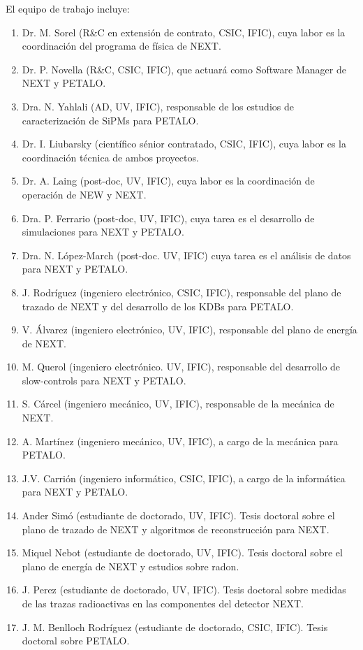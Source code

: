 El equipo de trabajo incluye:
\begin{enumerate}
\item Dr. M. Sorel (R\&C en extensión de contrato, CSIC, IFIC), cuya labor es la coordinación del programa de física de NEXT.
\item Dr. P. Novella (R\&C, CSIC, IFIC), que actuará como Software Manager de NEXT y PETALO.
\item Dra. N. Yahlali (AD, UV, IFIC), responsable de los estudios de caracterización de SiPMs para PETALO. 
\item Dr. I. Liubarsky (científico sénior contratado, CSIC, IFIC), cuya labor es la coordinación técnica de ambos proyectos.
\item Dr. A. Laing (post-doc, UV, IFIC), cuya labor es la coordinación de operación de NEW y NEXT.
\item Dra. P. Ferrario (post-doc, UV, IFIC), cuya tarea es el desarrollo de simulaciones para NEXT y PETALO. 
\item Dra. N. López-March (post-doc. UV, IFIC) cuya tarea es el análisis de datos para NEXT y PETALO.
\item J. Rodríguez (ingeniero electrónico, CSIC, IFIC), responsable del plano de trazado de NEXT y del desarrollo de los KDBs para PETALO. 
\item V. Álvarez (ingeniero electrónico, UV, IFIC), responsable del plano de energía de NEXT.
\item M. Querol (ingeniero electrónico. UV, IFIC), responsable del desarrollo de slow-controls para NEXT y PETALO.
\item S. Cárcel (ingeniero mecánico, UV, IFIC), responsable de la mecánica de NEXT.
\item A. Martínez (ingeniero mecánico, UV, IFIC), a cargo de la mecánica para PETALO. 
\item J.V. Carrión (ingeniero informático, CSIC, IFIC), a cargo de la informática para NEXT y PETALO. 
\item Ander Simó (estudiante de doctorado, UV, IFIC). Tesis doctoral sobre el plano de trazado de NEXT y algoritmos de reconstrucción para NEXT.
\item Miquel Nebot (estudiante de doctorado, UV, IFIC). Tesis doctoral sobre el plano de energía de NEXT y estudios sobre radon.
\item J. Perez (estudiante de doctorado, UV, IFIC). Tesis doctoral sobre medidas de las trazas radioactivas en las componentes del detector NEXT.
\item J. M. Benlloch Rodríguez (estudiante de doctorado, CSIC, IFIC). Tesis doctoral sobre PETALO.  
\end{enumerate}
























